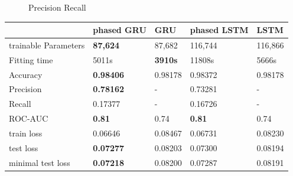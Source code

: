 \begin{figure}[h]
\begin{minipage}[c]{0.5\linewidth}
\caption{Precision Recall}
\label{fig:PR}
\end{minipage}%
\end{figure}


\begin{center}
\begin{tabular}{ |m{4cm}||m{2.5cm}|m{2.5cm}|m{2.5cm}|m{2.5cm}| } 
  \hline 
    & \textbf{phased GRU} & \textbf{GRU} & \textbf{phased LSTM} & \textbf{LSTM}\\ 
  \hline \hline
  trainable Parameters & \textbf{87,624} & 87,682 & 116,744 & 116,866 \\
  \hline
  Fitting time & 5011s &  \textbf{3910s} & 11808s & 5666s \\ 
  \hline
  Accuracy &  \textbf{0.98406} & 0.98178 & 0.98372 & 0.98178 \\ 
  \hline  
  Precision &  \textbf{0.78162} & - & 0.73281 & - \\ 
  \hline
  Recall & 0.17377 & - & 0.16726 & - \\ 
  \hline
  ROC-AUC & \textbf{0.81} & 0.74 &  \textbf{0.81} & 0.74 \\
  \hline  
  train loss &  0.06646 & 0.08467 & 0.06731 & {0.08230} \\ 
  \hline
  test loss &  \textbf{0.07277} & 0.08203  & 0.07300 & 0.08194 \\ 
  \hline
  minimal test loss &  \textbf{0.07218} & 0.08200 & 0.07287 & 0.08191 \\
  \hline
\end{tabular}
\end{center}



